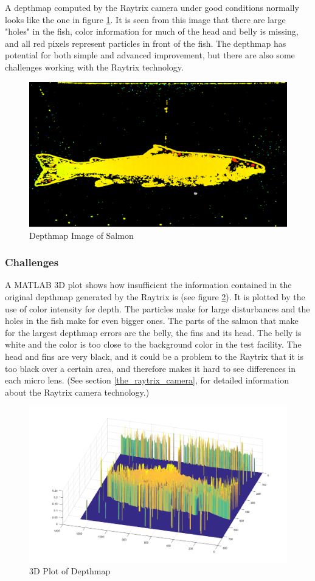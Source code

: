 A depthmap computed by the Raytrix camera under good conditions normally looks like the one in figure \ref{fig:depthmap82}. It is seen from this image that there are large "holes" in the fish, color information for much of the head and belly is missing, and all red pixels represent particles in front of the fish. The depthmap has potential for both simple and advanced improvement, but there are also some challenges working with the Raytrix technology.

\begin{figure}[H]
    \centering
    \includegraphics[width=.7\linewidth]{images/aim_of_study/depthmap82}
    \caption{Depthmap Image of Salmon}
    \label{fig:depthmap82}
\end{figure}



\subsubsection{Challenges}

A MATLAB 3D plot shows how insufficient the information contained in the original depthmap generated by the Raytrix is (see figure \ref{fig:matlab3D}). It is plotted by the use of color intensity for depth. The particles make for large disturbances and the holes in the fish make for even bigger ones. The parts of the salmon that make for the largest depthmap errors are the belly, the fins and its head. The belly is white and the color is too close to the background color in the test facility. The head and fins are very black, and it could be a problem to the Raytrix that it is too black over a certain area, and therefore makes it hard to see differences in each micro lens. (See section \ref{the_raytrix_camera}, for detailed information about the Raytrix camera technology.)

\begin{figure}[H]
    \centering
    \includegraphics[width=.7\linewidth]{images/aim_of_study/original_3D_87}
    \caption{3D Plot of Depthmap}
    \label{fig:matlab3D}
\end{figure}


